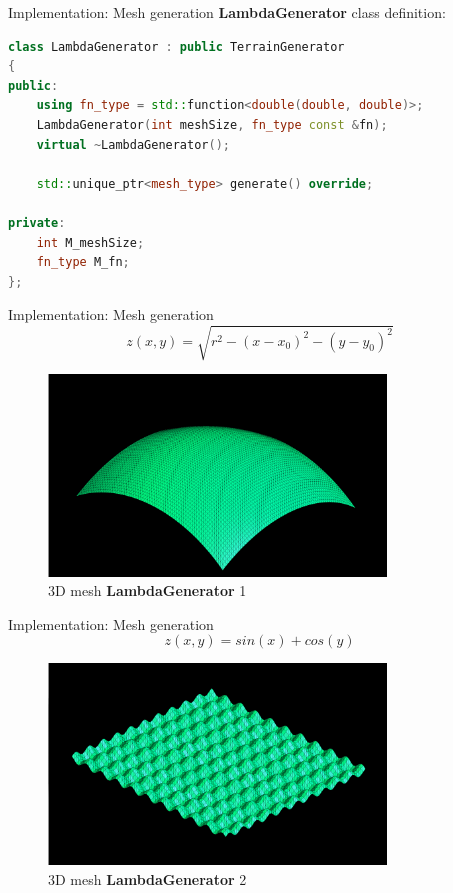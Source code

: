 \documentclass[10pt]{beamer}
\begin{document}
\begin{frame}[fragile]{Implementation: Mesh generation}
  \Large
  \textbf{LambdaGenerator} class definition:
  \vspace{1em}
  \begin{lstlisting}[language=C++]
class LambdaGenerator : public TerrainGenerator
{
public:
    using fn_type = std::function<double(double, double)>;
    LambdaGenerator(int meshSize, fn_type const &fn);
    virtual ~LambdaGenerator();

    std::unique_ptr<mesh_type> generate() override;

private:
    int M_meshSize;
    fn_type M_fn;
};
  \end{lstlisting}
\end{frame}

\begin{frame}{Implementation: Mesh generation}
  \Large
    \[
    z(x, y) = \sqrt{r^2 - (x - x_0)^2 - (y - y_0)^2}
    \]
  \begin{figure}[H]
      \centering
      \includegraphics[width=0.8\textwidth]{images/generated-lambda-1.png}
      \caption{3D mesh \textbf{LambdaGenerator} 1}
  \end{figure}
\end{frame}

\begin{frame}{Implementation: Mesh generation}
  \Large
    \[
    z(x, y) = sin(x) + cos(y)
    \]
  \begin{figure}[H]
      \centering
      \includegraphics[width=0.8\textwidth]{images/generated-lambda-2.png}
      \caption{3D mesh \textbf{LambdaGenerator} 2}
  \end{figure}
\end{frame}
\end{document}
